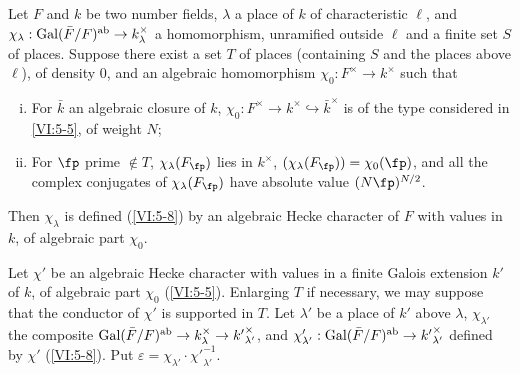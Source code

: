 \begin{theorem_}\label{VI:5-10}
Let $F$ and $k$ be two number fields, $\lambda$ a place of $k$ of
characteristic $\ell$, and
$\chi_\lambda:\operatorname{Gal}(\bar F/F)^\textnormal{ab}\to k_\lambda^\times$ a
homomorphism, unramified outside $\ell$ and a finite set $S$ of
places. Suppose there exist a set $T$ of places (containing $S$ and the
places above $\ell$), of density $0$, and an algebraic homomorphism
$\chi_0:F^\times \to k^\times$ such that
\begin{enumerate}[(i)]
  \item For $\bar k$ an algebraic closure of $k$,
    $\chi_0:F^\times \to k^\times \hookrightarrow \bar k^\times$ is of the type
    considered in \ref{VI:5-5}, of weight $N$;
  \item For $\fp$ prime $\notin T$, $\chi_\lambda(F_\fp)$ lies in
    $k^\times$, $(\chi_\lambda(F_\fp))=\chi_0(\fp)$, and all the complex
    conjugates of $\chi_\lambda(F_\fp)$ have absolute value $(N \fp)^{N/2}$.
\end{enumerate}

Then $\chi_\lambda$ is defined (\ref{VI:5-8}) by an algebraic Hecke
character of $F$ with values in $k$, of algebraic part $\chi_0$.
\end{theorem_}

Let $\chi'$ be an algebraic Hecke character with values in a
finite Galois extension $k'$ of $k$, of algebraic part $\chi_0$
(\ref{VI:5-5}). Enlarging $T$ if necessary, we may suppose that the conductor of
$\chi'$ is supported in $T$. Let $\lambda'$ be a place of $k'$ above
$\lambda$, $\chi_{\lambda'}$ the composite
$\operatorname{Gal}(\bar F/F)^\text{ab}\to k_\lambda^\times \to {k'}_{\lambda'}^\times$, and
$\chi_{\lambda'}':\operatorname{Gal}(\bar F/F)^\text{ab}\to {k'}_{\lambda'}^\times$ defined
by $\chi'$ (\ref{VI:5-8}). Put
$\varepsilon = \chi_{\lambda'} \cdot {\chi'}_{\lambda'}^{-1}$.

